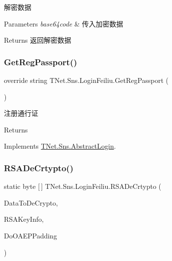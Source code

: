 解密数据 


\begin{DoxyParams}{Parameters}
{\em base64code} & 传入加密数据\\
\hline
\end{DoxyParams}
\begin{DoxyReturn}{Returns}
返回解密数据
\end{DoxyReturn}
\mbox{\label{class_t_net_1_1_sns_1_1_login_feiliu_a9a146d3872f6c613a650ad832fd2d68b}} 
\subsubsection{\texorpdfstring{Get\+Reg\+Passport()}{GetRegPassport()}}
{\footnotesize\ttfamily override string T\+Net.\+Sns.\+Login\+Feiliu.\+Get\+Reg\+Passport (\begin{DoxyParamCaption}{ }\end{DoxyParamCaption})\hspace{0.3cm}{\ttfamily [virtual]}}



注册通行证 

\begin{DoxyReturn}{Returns}

\end{DoxyReturn}


Implements \mbox{\hyperlink{class_t_net_1_1_sns_1_1_abstract_login_a3930eb564bb4804e1b646d749f20907a}{T\+Net.\+Sns.\+Abstract\+Login}}.

\mbox{\label{class_t_net_1_1_sns_1_1_login_feiliu_a6b894098014c172f7e7de1ec1145bd1b}} 
\subsubsection{\texorpdfstring{R\+S\+A\+De\+Crtypto()}{RSADeCrtypto()}}
{\footnotesize\ttfamily static byte \mbox{[}$\,$\mbox{]} T\+Net.\+Sns.\+Login\+Feiliu.\+R\+S\+A\+De\+Crtypto (\begin{DoxyParamCaption}\item[{byte \mbox{[}$\,$\mbox{]}}]{Data\+To\+De\+Crypto,  }\item[{R\+S\+A\+Parameters}]{R\+S\+A\+Key\+Info,  }\item[{bool}]{Do\+O\+A\+E\+P\+Padding }\end{DoxyParamCaption})\hspace{0.3cm}{\ttfamily [static]}}



